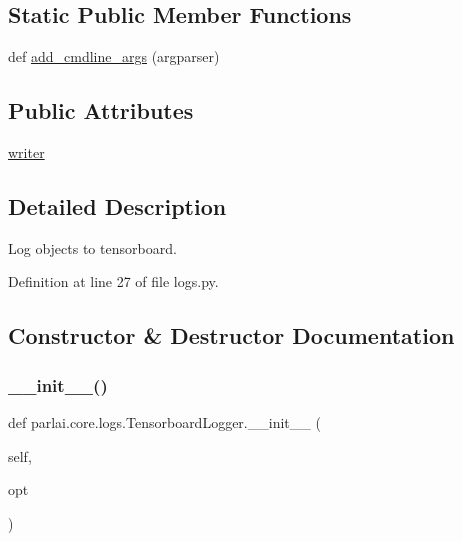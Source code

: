 \subsection*{Static Public Member Functions}
\begin{DoxyCompactItemize}
\item 
def \hyperlink{classparlai_1_1core_1_1logs_1_1TensorboardLogger_a22488a4b41a75dce0a1c467418882e83}{add\+\_\+cmdline\+\_\+args} (argparser)
\end{DoxyCompactItemize}
\subsection*{Public Attributes}
\begin{DoxyCompactItemize}
\item 
\hyperlink{classparlai_1_1core_1_1logs_1_1TensorboardLogger_afc71d93e950d01b95fc824d347907a58}{writer}
\end{DoxyCompactItemize}


\subsection{Detailed Description}
\begin{DoxyVerb}Log objects to tensorboard.
\end{DoxyVerb}
 

Definition at line 27 of file logs.\+py.



\subsection{Constructor \& Destructor Documentation}
\mbox{\label{classparlai_1_1core_1_1logs_1_1TensorboardLogger_a771ea3df52af2ad82a038446fb15fdf3}} 
\subsubsection{\texorpdfstring{\+\_\+\+\_\+init\+\_\+\+\_\+()}{\_\_init\_\_()}}
{\footnotesize\ttfamily def parlai.\+core.\+logs.\+Tensorboard\+Logger.\+\_\+\+\_\+init\+\_\+\+\_\+ (\begin{DoxyParamCaption}\item[{}]{self,  }\item[{}]{opt }\end{DoxyParamCaption})}



